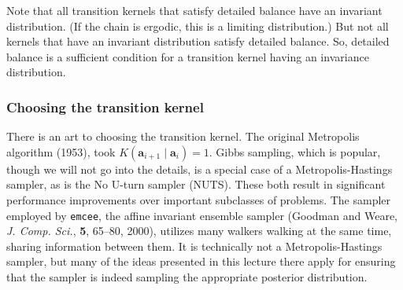Note that all transition kernels that satisfy detailed balance have an
invariant distribution.  (If the chain is ergodic, this is a limiting
distribution.)  But not all kernels that have an invariant
distribution satisfy detailed balance.  So, detailed balance is a
sufficient condition for a transition kernel having an invariance
distribution.


\subsubsection{Choosing the transition kernel}
There is an art to choosing the transition kernel.  The original
Metropolis algorithm (1953), took
$K(\mathbf{a}_{i+1}\mid \mathbf{a}_i) = 1$.  Gibbs sampling, which is
popular, though we will not go into the details, is a special case of
a Metropolis-Hastings sampler, as is the No U-turn sampler (NUTS).
These both result in significant performance improvements over
important subclasses of problems.  The sampler employed by
\texttt{emcee}, the affine invariant ensemble sampler (Goodman and
Weare, \textit{J. Comp. Sci.}, \textbf{5}, 65--80, 2000), utilizes
many walkers walking at the same time, sharing information between
them.  It is technically not a Metropolis-Hastings sampler, but many
of the ideas presented in this lecture there apply for ensuring that
the sampler is indeed sampling the appropriate posterior distribution.
